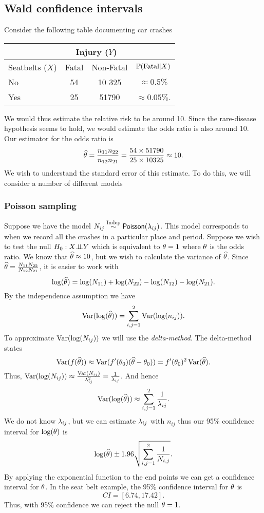 \subsection{Wald confidence intervals}
Consider the following table documenting car crashes 
\begin{center}
    \begin{tabular}{l|cc|c}
        &\multicolumn{2}{|c|}{Injury ($Y$)}&\\
        \hline 
        Seatbelts ($X$) & Fatal & Non-Fatal & ${\mathbb{P}}(\text{Fatal}|X)$\\
        \hline 
        No & 54 & 10 325 & $\approx 0.5\%$\\
        Yes & 25 & 51790 & $\approx 0.05\%$.
        
    \end{tabular}
\end{center}
We would thus estimate the relative risk to be around 10. Since the rare-disease hypothesis seems to hold, we would estimate the odds ratio is also around 10. Our estimator for the odds ratio is
\[\widehat{{\theta}} = \frac{n_{11}n_{22}}{n_{12}n_{21}} = \frac{54\times 51790}{25\times 10325} \approx 10. \]
We wish to understand the standard error of this estimate. To do this, we will consider a number of different models
\subsubsection{Poisson sampling}
Suppose we have the model $N_{ij} \stackrel{\text{Indep}}{\sim} \mathsf{Poisson}(\lambda_{ij})$. This model corresponds to when we record all the crashes in a particular place and period. Suppose we wish to test the null $H_0:X {\perp\!\!\!\perp} Y$ which is equivalent to ${\theta} = 1$ where ${\theta}$ is the odds ratio. We know that $\widehat{{\theta}} \approx 10$, but we wish to calculate the variance of $\widehat{{\theta}}$. Since $\widehat{{\theta}} = \frac{N_{11}N_{22}}{N_{12}N_{21}}$, it is easier to work with \[\log(\widehat{{\theta}}) = \log(N_{11})+\log(N_{22})-\log(N_{12})-\log(N_{21}).\] By the independence assumption we have 
\[\operatorname{Var}(\log(\widehat{{\theta}})) = \sum_{i,j=1}^2 \operatorname{Var}(\log(n_{ij})). \]
To approximate $\operatorname{Var}(\log(N_{ij}))$ we will use the \emph{delta-method}. The delta-method states 
\[\operatorname{Var}(f(\widehat{{\theta}})) \approx \operatorname{Var}(f'({\theta}_0)(\widehat{{\theta}}-{\theta}_0)) = f'({\theta}_0)^2\operatorname{Var}(\widehat{{\theta}}). \]
Thus, $\operatorname{Var}(\log(N_{ij})) \approx \frac{\operatorname{Var}(N_{ij})}{\lambda_{ij}^2} = \frac{1}{\lambda_{ij}}$. And hence
\[\operatorname{Var}(\log(\widehat{{\theta}})) \approx \sum_{i,j=1}^2 \frac{1}{\lambda_{ij}}. \]
We do not know $\lambda_{ij}$, but we can estimate $\lambda_{ij}$ with $n_{ij}$ thus our 95\% confidence interval for $\log({\theta})$ is 
\[\log(\widehat{{\theta}})\pm 1.96\sqrt{\sum_{i,j=1}^2 \frac{1}{N_{i,j}}}. \]
By applying the exponential function to the end points we can get a confidence interval for ${\theta}$. In the seat belt example, the 95\% confidence interval for ${\theta}$ is
\[CI = [6.74, 17.42]. \]
Thus, with 95\% confidence we can reject the null ${\theta} = 1$. 

